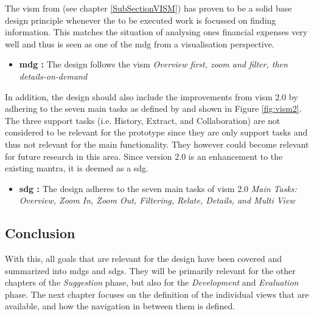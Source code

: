 The \gls{vism} from \cite{Shneiderman2005} (see chapter \ref{SubSectionVISM}) has proven to be a solid base design principle whenever the to be executed work is focussed on finding information. This matches the situation of analysing ones financial expenses very well and thus is seen as one of the \gls{mdg} from a visualisation perspective.
\begin{itemize}[noitemsep,nolistsep]
	\item \textbf{\gls{mdg} :} The design follows the \gls{vism} \newline
		\textit{Overview first, zoom and filter, then details-on-demand}
\end{itemize}
In addition, the design should also include the improvements from \gls{vism} 2.0 by adhering to the seven main tasks as defined by \cite{Stauffer2016} and shown in Figure \ref{fig:vism2}. The three support tasks (i.e. History, Extract, and Collaboration) are not considered to be relevant for the prototype since they are only support tasks and thus not relevant for the main functionality. They however could become relevant for future research in this area. Since version 2.0 is an enhancement to the existing mantra, it is deemed as a \gls{sdg}.
\begin{itemize}[noitemsep,nolistsep]
	\item \textbf{\gls{sdg} :} The design adheres to the seven main tasks of \gls{vism} 2.0 \newline
		\textit{Main Tasks: Overview, Zoom In, Zoom Out, Filtering, Relate, Details, and Multi View}
\end{itemize}

\addtocounter{MainDesignGoalCounter}{-1}
\addtocounter{SubDesignGoalCounter}{-1}



\subsection{Conclusion}

With this, all goals that are relevant for the design have been covered and summarized into  \glspl{mdg} and  \glspl{sdg}. They will be primarily relevant for the other chapters of the \textit{Suggestion} phase, but also for the \textit{Development} and \textit{Evaluation} phase. \newline
The next chapter focuses on the definition of the individual views that are available, and how the navigation in between them is defined.


